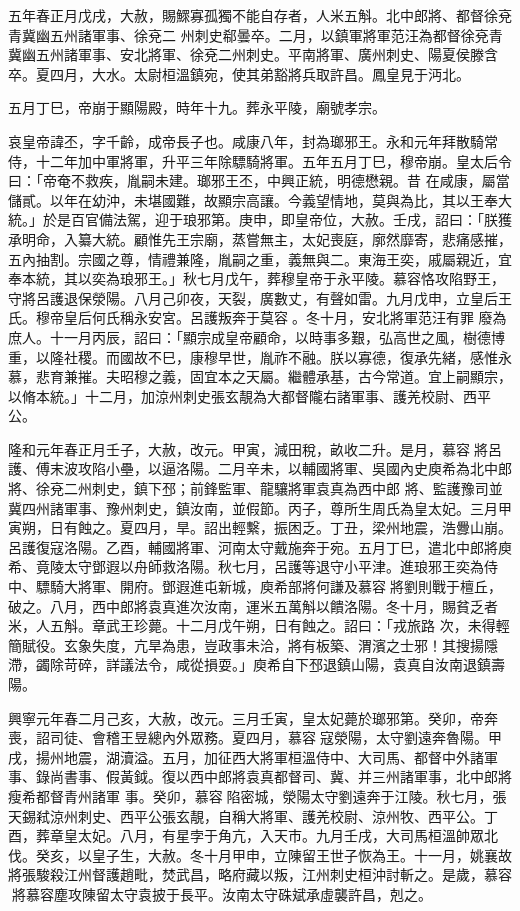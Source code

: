 \begin{pinyinscope}
 五年春正月戊戌，大赦，賜鰥寡孤獨不能自存者，人米五斛。北中郎將、都督徐兗青冀幽五州諸軍事、徐兗二
 州刺史郗曇卒。二月，以鎮軍將軍范汪為都督徐兗青冀幽五州諸軍事、安北將軍、徐兗二州刺史。平南將軍、廣州刺史、陽夏侯滕含卒。夏四月，大水。太尉桓溫鎮宛，使其弟豁將兵取許昌。鳳皇見于沔北。



 五月丁巳，帝崩于顯陽殿，時年十九。葬永平陵，廟號孝宗。



 哀皇帝諱丕，字千齡，成帝長子也。咸康八年，封為瑯邪王。永和元年拜散騎常侍，十二年加中軍將軍，升平三年除驃騎將軍。五年五月丁巳，穆帝崩。皇太后令曰：「帝奄不救疾，胤嗣未建。瑯邪王丕，中興正統，明德懋親。昔
 在咸康，屬當儲貳。以年在幼沖，未堪國難，故顯宗高讓。今義望情地，莫與為比，其以王奉大統。」於是百官備法駕，迎于琅邪第。庚申，即皇帝位，大赦。壬戌，詔曰：「朕獲承明命，入纂大統。顧惟先王宗廟，蒸嘗無主，太妃喪庭，廓然靡寄，悲痛感摧，五內抽割。宗國之尊，情禮兼隆，胤嗣之重，義無與二。東海王奕，戚屬親近，宜奉本統，其以奕為琅邪王。」秋七月戊午，葬穆皇帝于永平陵。慕容恪攻陷野王，守將呂護退保滎陽。八月己卯夜，天裂，廣數丈，有聲如雷。九月戊申，立皇后王氏。穆帝皇后何氏稱永安宮。呂護叛奔于莫容。冬十月，安北將軍范汪有罪
 廢為庶人。十一月丙辰，詔曰：「顯宗成皇帝顧命，以時事多艱，弘高世之風，樹德博重，以隆社稷。而國故不巳，康穆早世，胤祚不融。朕以寡德，復承先緒，感惟永慕，悲育兼摧。夫昭穆之義，固宜本之天屬。繼體承基，古今常道。宜上嗣顯宗，以脩本統。」十二月，加涼州刺史張玄靚為大都督隴右諸軍事、護羌校尉、西平公。



 隆和元年春正月壬子，大赦，改元。甲寅，減田稅，畝收二升。是月，慕容將呂護、傅末波攻陷小壘，以逼洛陽。二月辛未，以輔國將軍、吳國內史庾希為北中郎將、徐兗二州刺史，鎮下邳；前鋒監軍、龍驤將軍袁真為西中郎
 將、監護豫司並冀四州諸軍事、豫州刺史，鎮汝南，並假節。丙子，尊所生周氏為皇太妃。三月甲寅朔，日有蝕之。夏四月，旱。詔出輕繫，振困乏。丁丑，梁州地震，浩釁山崩。呂護復寇洛陽。乙酉，輔國將軍、河南太守戴施奔于宛。五月丁巳，遣北中郎將庾希、竟陵太守鄧遐以舟師救洛陽。秋七月，呂護等退守小平津。進琅邪王奕為侍中、驃騎大將軍、開府。鄧遐進屯新城，庾希部將何謙及慕容將劉則戰于檀丘，破之。八月，西中郎將袁真進次汝南，運米五萬斛以饋洛陽。冬十月，賜貧乏者米，人五斛。章武王珍薨。十二月戊午朔，日有蝕之。詔曰：「戎旅路
 次，未得輕簡賦役。玄象失度，亢旱為患，豈政事未洽，將有板築、渭濱之士邪！其搜揚隱滯，蠲除苛碎，詳議法令，咸從損耍。」庾希自下邳退鎮山陽，袁真自汝南退鎮壽陽。



 興寧元年春二月己亥，大赦，改元。三月壬寅，皇太妃薨於瑯邪第。癸卯，帝奔喪，詔司徒、會稽王昱總內外眾務。夏四月，慕容寇滎陽，太守劉遠奔魯陽。甲戌，揚州地震，湖瀆溢。五月，加征西大將軍桓溫侍中、大司馬、都督中外諸軍事、錄尚書事、假黃鉞。復以西中郎將袁真都督司、冀、并三州諸軍事，北中郎將瘦希都督青州諸軍
 事。癸卯，慕容陷密城，滎陽太守劉遠奔于江陵。秋七月，張天錫弒涼州刺史、西平公張玄靚，自稱大將軍、護羌校尉、涼州牧、西平公。丁酉，葬章皇太妃。八月，有星孛于角亢，入天市。九月壬戌，大司馬桓溫帥眾北伐。癸亥，以皇子生，大赦。冬十月甲申，立陳留王世子恢為王。十一月，姚襄故將張駿殺江州督護趙毗，焚武昌，略府藏以叛，江州刺史桓沖討斬之。是歲，慕容將慕容塵攻陳留太守袁披于長平。汝南太守硃斌承虛襲許昌，剋之。




\end{pinyinscope}
